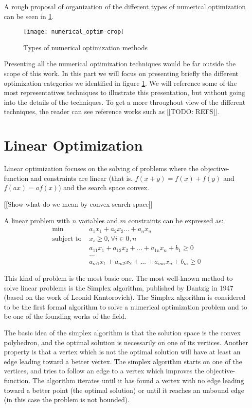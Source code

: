 A rough proposal of organization of the different types of numerical optimization can be seen in \ref{numerical_optim_tree}.

\begin{figure}
\texttt{[image: numerical\_optim-crop]}
\caption{Types of numerical optimization methods}
\label{numerical_optim_tree}
\end{figure}

Presenting all the numerical optimization techniques would be far outside the scope of this work. In this part we will focus on presenting briefly the different optimization categories we identified in figure \ref{numerical_optim_tree}. We will reference some of the most representatives techniques to illustrate this presentation, but without going into the details of the techniques. To get a more throughout view of the different techniques, the reader can see reference works such as [[TODO: REFS]].

\section{Linear Optimization}\label{linear_optim}

Linear optimization focuses on the solving of problems where the objective-function and constraints are linear (that is, $f(x+y) = f(x)+f(y)$ and $f(ax) = af(x)$) and the search space convex.

[[Show what do we mean by convex search space]]

A linear problem with $n$ variables and $m$ constraints can be expressed as:
\begin{align*}
\text{min } & a_1x_1 + a_2x_2... + a_nx_n\\
\text{subject to } &x_i \geq 0, \forall i \in 0,n\\
&a_{11}x_1 + a_{12}x_2 + ... + a_{1n}x_n + b_1 \geq 0\\
&...\\
&a_{m1}x_1 + a_{m2}x_2 + ... + a_{mn}x_n + b_m \geq 0
\end{align*}

This kind of problem is the most basic one. The most well-known method to solve linear problems is the Simplex algorithm\cite{dantzig1998linear}, published by Dantzig in 1947 (based on the work of Leonid Kantorovich). The Simplex algorithm is considered to be the first formal algorithm to solve a numerical optimization problem and to be one of the founding works of the field.

The basic idea of the simplex algorithm is that the solution space is the convex polyhedron, and the optimal solution is necessarily on one of its vertices. Another property is that a vertex which is not the optimal solution will have at least an edge leading toward a better vertex.
The simplex algorithm starts on one of the vertices, and tries to follow an edge to a vertex which improves the objective-function. The algorithm iterates until it has found a vertex with no edge leading toward a better point (the optimal solution) or until it reaches an unbound edge (in this case the problem is not bounded).

